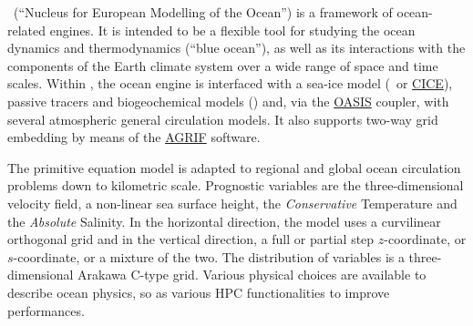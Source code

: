 
\NEMO\ (``Nucleus for European Modelling of the Ocean'') is a framework of ocean-related engines.
It is intended to be a flexible tool for studying the ocean dynamics and thermodynamics (``blue ocean''),
as well as its interactions with the components of the Earth climate system over
a wide range of space and time scales.
Within \NEMO, the ocean engine is interfaced with a sea-ice model (\SIcube\ or
\href{http://github.com/CICE-Consortium/CICE}{CICE}),
passive tracers and biogeochemical models (\TOP) and,
via the \href{http://portal.enes.org/oasis}{OASIS} coupler,
with several atmospheric general circulation models.
It also supports two-way grid embedding by means of the \href{http://agrif.imag.fr}{AGRIF} software.

The primitive equation model is adapted to regional and global ocean circulation problems down to
kilometric scale.
Prognostic variables are the three-dimensional velocity field, a non-linear sea surface height,
the \textit{Conservative} Temperature and the \textit{Absolute} Salinity.
In the horizontal direction, the model uses a curvilinear orthogonal grid and
in the vertical direction, a full or partial step $z$-coordinate, or $s$-coordinate, or
a mixture of the two.
The distribution of variables is a three-dimensional Arakawa C-type grid.
Various physical choices are available to describe ocean physics,
so as various HPC functionalities to improve performances.

